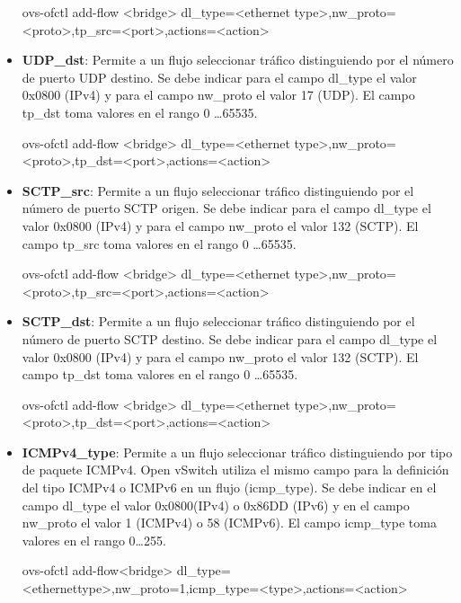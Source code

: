 \begin{itemize}
\begin{center}
ovs-ofctl add-flow <bridge> dl\_type=<ethernet type>,nw\_proto=<proto>,tp\_src=<port>,actions=<action>
\end{center}

\item \textbf{UDP\_dst}: Permite a un flujo seleccionar tr\'afico distinguiendo por el n\'umero de puerto UDP destino. Se debe indicar para el campo dl\_type el valor 0x0800 (IPv4) y para el campo nw\_proto el valor 17 (UDP). El campo tp\_dst toma valores en el rango 0 \dots 65535.

\begin{center}
ovs-ofctl add-flow <bridge> dl\_type=<ethernet type>,nw\_proto=<proto>,tp\_dst=<port>,actions=<action>
\end{center}

\item \textbf{SCTP\_src}: Permite a un flujo seleccionar tr\'afico distinguiendo por el n\'umero de puerto SCTP origen. Se debe indicar para el campo dl\_type el valor 0x0800 (IPv4) y para el campo nw\_proto el valor 132 (SCTP). El campo tp\_src toma valores en el rango 0 \dots 65535.

\begin{center}
ovs-ofctl add-flow <bridge> dl\_type=<ethernet type>,nw\_proto=<proto>,tp\_src=<port>,actions=<action>
\end{center}

\item \textbf{SCTP\_dst}: Permite a un flujo seleccionar tr\'afico distinguiendo por el n\'umero de puerto SCTP destino. Se debe indicar para el campo dl\_type el valor 0x0800 (IPv4) y para el campo nw\_proto el valor 132 (SCTP). El campo tp\_dst toma valores en el rango 0 \dots 65535.

\begin{center}
ovs-ofctl add-flow <bridge> dl\_type=<ethernet type>,nw\_proto=<proto>,tp\_dst=<port>,actions=<action>
\end{center}

\item \textbf{ICMPv4\_type}: Permite a un flujo seleccionar tr\'afico distinguiendo por tipo de paquete ICMPv4. Open vSwitch utiliza el mismo campo para la definici\'on del tipo ICMPv4 o ICMPv6 en un flujo (icmp\_type). Se debe indicar en el campo dl\_type el valor 0x0800(IPv4) o 0x86DD (IPv6) y en el campo nw\_proto el valor 1 (ICMPv4) o 58 (ICMPv6). El campo icmp\_type toma valores en el rango 0\dots 255.

\begin{center}
ovs-ofctl add-flow<bridge> dl\_type=<ethernettype>,nw\_proto=1,icmp\_type=<type>,actions=<action>
\end{center}


\end{itemize}
